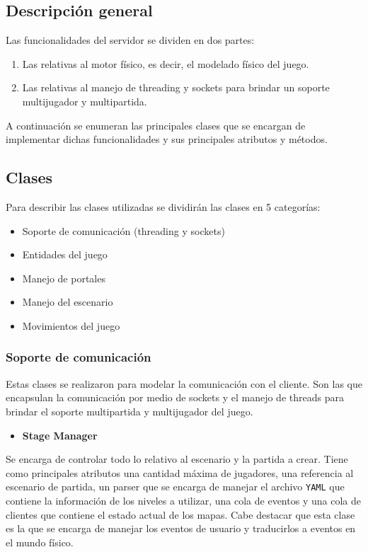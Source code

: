 \documentclass[a4paper]{article}
\begin{document}
\subsection{Descripción general}
Las funcionalidades del servidor se dividen en dos partes:
\begin{enumerate}
	\item Las relativas al motor físico, es decir, el modelado físico del juego.
	\item Las relativas al manejo de threading y sockets para brindar un soporte multijugador y multipartida.
\end{enumerate}

A continuación se enumeran las principales clases que se encargan de implementar dichas funcionalidades y sus principales atributos y métodos.

\subsection{Clases}

Para describir las clases utilizadas se dividirán las clases en 5 categorías:
\begin{itemize}
	\item Soporte de comunicación (threading y sockets)
	\item Entidades del juego
	\item Manejo de portales
	\item Manejo del escenario
	\item Movimientos del juego
\end{itemize} 

\subsubsection{Soporte de comunicación}

Estas clases se realizaron para modelar la comunicación con el cliente. Son las que encapsulan la comunicación por medio de sockets y el manejo de threads para brindar el soporte multipartida y multijugador del juego.

\begin{itemize}
	\item \textbf{Stage Manager}
\end{itemize}

Se encarga de controlar todo lo relativo al escenario y la partida a crear. Tiene como principales atributos una cantidad máxima de jugadores, una referencia al escenario de partida, un parser que se encarga de manejar el archivo \texttt{YAML} que contiene la información de los niveles a utilizar, una cola de eventos y una cola de clientes que contiene el estado actual de los mapas.  Cabe destacar que esta clase es la que se encarga de manejar los eventos de usuario y traducirlos a eventos en el mundo físico.
\end{document}
